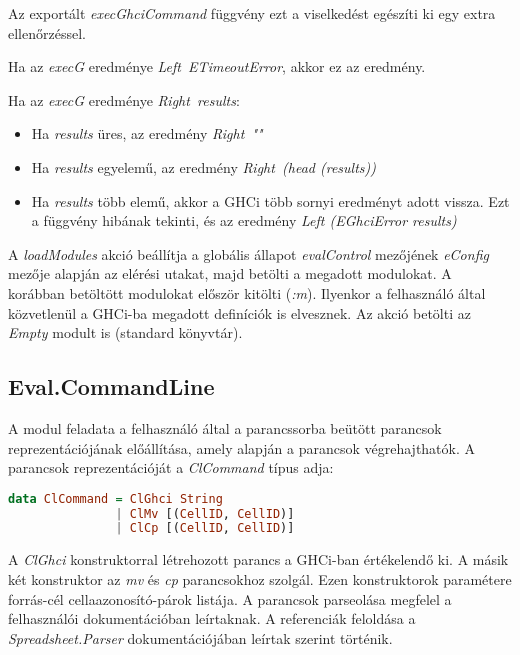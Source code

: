 Az exportált \textit{execGhciCommand} függvény ezt a viselkedést egészíti ki egy extra ellenőrzéssel.
\begin{compactenum}
	\item Ha az \textit{execG} eredménye \textit{Left\ ETimeoutError}, akkor ez az eredmény.
	\item Ha az \textit{execG} eredménye \textit{Right\ results}:
	\begin{itemize}
		\item Ha \textit{results} üres, az eredmény \textit{Right\ ""}
		\item Ha \textit{results} egyelemű, az eredmény \textit{Right\ (head (results))}
		\item Ha \textit{results} több elemű, akkor a GHCi több sornyi eredményt adott vissza. Ezt a függvény hibának tekinti, és az eredmény \textit{Left (EGhciError results)}
	\end{itemize}
\end{compactenum}

A \textit{loadModules} akció beállítja a globális állapot \textit{evalControl} mezőjének \textit{eConfig} mezője alapján az elérési utakat, majd betölti a megadott modulokat. A korábban betöltött modulokat először kitölti (\textit{:m}). Ilyenkor a felhasználó által közvetlenül a GHCi-ba megadott definíciók is elvesznek. Az akció betölti az \textit{Empty} modult is (standard könyvtár).

\subsection{Eval.CommandLine}

A modul feladata a felhasználó által a parancssorba beütött parancsok reprezentációjának előállítása, amely alapján a parancsok végrehajthatók. A parancsok reprezentációját a \textit{ClCommand} típus adja:

\begin{lstlisting}[language={Haskell}]
data ClCommand = ClGhci String
               | ClMv [(CellID, CellID)]
               | ClCp [(CellID, CellID)]
\end{lstlisting}

A \textit{ClGhci} konstruktorral létrehozott parancs a GHCi-ban értékelendő ki. A másik két konstruktor az \textit{mv} és \textit{cp} parancsokhoz szolgál. Ezen konstruktorok paramétere forrás-cél cellaazonosító-párok listája. A parancsok parseolása megfelel a felhasználói dokumentációban leírtaknak. A referenciák feloldása a \textit{Spreadsheet.Parser} dokumentációjában leírtak szerint történik.

